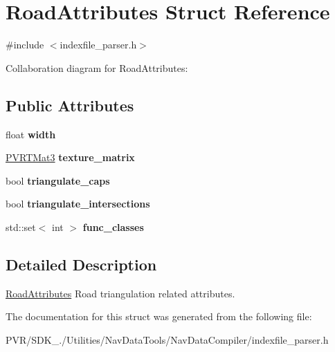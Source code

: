 \hypertarget{struct_road_attributes}{\section{Road\+Attributes Struct Reference}
\label{struct_road_attributes}
}


{\ttfamily \#include $<$indexfile\+\_\+parser.\+h$>$}



Collaboration diagram for Road\+Attributes\+:
\subsection*{Public Attributes}
\begin{DoxyCompactItemize}
\item 
\hypertarget{struct_road_attributes_af8b02426b4e99ce7f9f0729e7742e2b0}{float {\bfseries width}}\label{struct_road_attributes_af8b02426b4e99ce7f9f0729e7742e2b0}

\item 
\hypertarget{struct_road_attributes_a70407bf57255aab79584caf335110f40}{\hyperlink{struct_p_v_r_t_mat3}{P\+V\+R\+T\+Mat3} {\bfseries texture\+\_\+matrix}}\label{struct_road_attributes_a70407bf57255aab79584caf335110f40}

\item 
\hypertarget{struct_road_attributes_ad68b5d4f043c3cd52e12bea8bbf92313}{bool {\bfseries triangulate\+\_\+caps}}\label{struct_road_attributes_ad68b5d4f043c3cd52e12bea8bbf92313}

\item 
\hypertarget{struct_road_attributes_a5338190bd375e274f01a6fb4bc1d3976}{bool {\bfseries triangulate\+\_\+intersections}}\label{struct_road_attributes_a5338190bd375e274f01a6fb4bc1d3976}

\item 
\hypertarget{struct_road_attributes_abc29d5dc4b4306fee29b5f1b9eae60ec}{std\+::set$<$ int $>$ {\bfseries func\+\_\+classes}}\label{struct_road_attributes_abc29d5dc4b4306fee29b5f1b9eae60ec}

\end{DoxyCompactItemize}


\subsection{Detailed Description}


  \hyperlink{struct_road_attributes}{Road\+Attributes}  Road triangulation related attributes. 

The documentation for this struct was generated from the following file\+:\begin{DoxyCompactItemize}
\item 
P\+V\+R/\+S\+D\+K\+\_./\+Utilities/\+Nav\+Data\+Tools/\+Nav\+Data\+Compiler/indexfile\+\_\+parser.\+h\end{DoxyCompactItemize}
